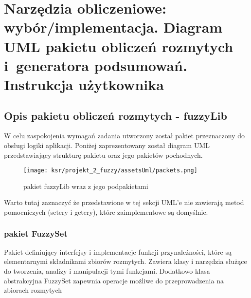 \documentclass{article}
\begin{document}

\section{Narzędzia obliczeniowe: wybór/implementacja. Diagram UML pakietu
obliczeń rozmytych i~generatora podsumowań. Instrukcja użytkownika}


\subsection{Opis pakietu obliczeń rozmytych - fuzzyLib}

\noindent W celu zaspokojenia wymagań zadania utworzony został pakiet przeznaczony do obsługi logiki aplikacji. Poniżej zaprezentowany został diagram UML przedstawiający strukturę pakietu oraz jego pakietów pochodnych.

\begin{figure}[H]
\centering
\texttt{[image: ksr/projekt\_2\_fuzzy/assetsUml/packets.png]}
\caption{pakiet fuzzyLib wraz z jego podpakietami}
\label{fig:epsilon_bat}
\end{figure}

\noindent Warto tutaj zaznaczyć że przedstawione w tej sekcji UML'e nie zawierają metod pomocniczych (setery i getery), które zaimplementowe są domyślnie.

\subsubsection{pakiet FuzzySet}

\noindent Pakiet definiujący interfejsy i implementacje funkcji przynależności, które są elementarnymi składnikami zbiorów rozmytych. Zawiera klasy i narzędzia służące do tworzenia, analizy i manipulacji tymi funkcjami. Dodatkowo klasa abstrakcyjna FuzzySet zapewnia operacje możliwe do przeprowadzenia na zbiorach rozmytych
\end{document}
